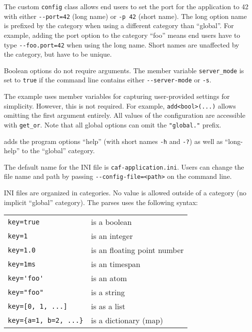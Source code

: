 The custom \lstinline^config^ class allows end users to set the port for the
application to 42 with either \lstinline^--port=42^ (long name) or
\lstinline^-p 42^ (short name). The long option name is prefixed by the
category when using a different category than ``global''. For example, adding
the port option to the category ``foo'' means end users have to type
\lstinline^--foo.port=42^ when using the long name. Short names are unaffected
by the category, but have to be unique.

Boolean options do not require arguments. The member variable
\lstinline^server_mode^ is set to \lstinline^true^ if the command line contains
either \lstinline^--server-mode^ or \lstinline^-s^.

The example uses member variables for capturing user-provided settings for
simplicity. However, this is not required. For example,
\lstinline^add<bool>(...)^ allows omitting the first argument entirely. All
values of the configuration are accessible with \lstinline^get_or^. Note that
all global options can omit the \lstinline^"global."^ prefix.

\lib adds the program options ``help'' (with short names \lstinline^-h^ and
\lstinline^-?^) as well as ``long-help'' to the ``global'' category.

The default name for the INI file is \lstinline^caf-application.ini^. Users can
change the file name and path by passing \lstinline^--config-file=<path>^ on
the command line.

INI files are organized in categories. No value is allowed outside of a
category (no implicit ``global'' category). The parses uses the following
syntax:

\begin{tabular}{p{}p{}}
  \lstinline^key=true^ & is a boolean \\
  \lstinline^key=1^ & is an integer \\
  \lstinline^key=1.0^ & is an floating point number \\
  \lstinline^key=1ms^ & is an timespan \\
  \lstinline^key='foo'^ & is an atom \\
  \lstinline^key="foo"^ & is a string \\
  \lstinline^key=[0, 1, ...]^ & is as a list \\
  \lstinline^key={a=1, b=2, ...}^ & is a dictionary (map) \\
\end{tabular}

